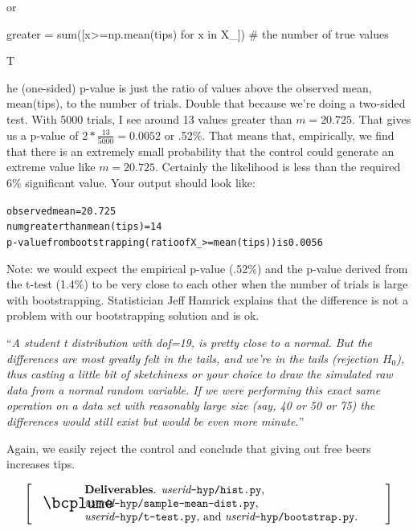 \documentclass[titlepage]{tufte-book}
\makeatletter
\newcounter{problem}
\newcommand{\step}[1]{{}
\vspace{4pt} \noindent {\bf \theproblem. }#1\addtocounter{problem}{1}}
\newenvironment{callout}[1]{
\[
  \left[
      \begin{tabular}{@{\quad}m{.05\textwidth}@{\qquad}m{.75\textwidth}@{\quad}}
        \scalebox{1.5}{#1} & 
          \raggedright%
}
{
      \end{tabular}
    \right]
\]
}
\makeatother
\begin{document}
\begin{fullwidth}
or

\begin{pyverbatim}
greater = sum([x>=np.mean(tips) for x in X_]) # the number of true values
\end{pyverbatim}

\step The (one-sided) p-value is just the ratio of values above the observed mean, mean(tips), to the number of trials. Double that because we're doing a two-sided test.  With 5000 trials, I see around 13 values greater than $m=20.725$. That gives us a p-value of $2*\frac{13}{5000} = 0.0052$ or .52\%. That means that, empirically, we find that there is an extremely small probability that the control could generate an extreme value like $m=20.725$. Certainly the likelihood is less than the required 6\% significant value.  Your output should look like:

\begin{alltt}
observed mean = 20.725
num greater than mean(tips) = 14
p-value from bootstrapping (ratio of X_ >= mean(tips)) is 0.0056
\end{alltt}

Note: we would expect the empirical p-value (.52\%) and the p-value derived from the t-test (1.4\%) to be very close to each other when the number of trials is large with bootstrapping.  Statistician Jeff Hamrick explains that the difference is not a problem with our bootstrapping solution and is ok.

``{\em A student t distribution with dof=19, is pretty close to a normal. But the differences are most greatly felt in the tails, and we're in the tails (rejection $H_{0}$), thus casting a little bit of sketchiness or your choice to draw the simulated raw data from a normal random variable. If we were performing this exact same operation on a data set with reasonably large size (say, 40 or 50 or 75) the differences would still exist but would be even more minute.}''

Again, we easily reject the control and conclude that giving out free beers increases tips.

\begin{callout}{\bcplume}
{\bf Deliverables}. {\em userid}{\tt -hyp/hist.py}, {\em userid}{\tt -hyp/sample-mean-dist.py}, {\em userid}{\tt -hyp/t-test.py}, and {\em userid}{\tt -hyp/bootstrap.py}.
\end{callout}

\end{fullwidth}
\end{document}
